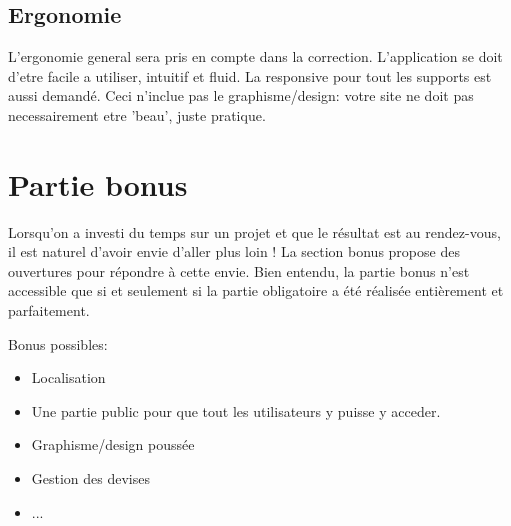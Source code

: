 \documentclass{42}
\begin{document}
    \section{Ergonomie}

        L'ergonomie general sera pris en compte dans la correction.
        L'application se doit d'etre facile a utiliser, intuitif et fluid. La
        responsive pour tout les supports est aussi demand\'e. Ceci n'inclue pas
        le graphisme/design: votre site ne doit pas necessairement etre 'beau',
        juste pratique.


\chapter{Partie bonus}

    Lorsqu'on a investi du temps sur un projet et que le r\'esultat
    est au rendez-vous, il est naturel d'avoir envie d'aller plus loin
    ! La section bonus propose des ouvertures pour r\'epondre \`a
    cette envie. Bien entendu, la partie bonus n'est accessible que si
    et seulement si la partie obligatoire a \'et\'e r\'ealis\'ee
    enti\`erement et parfaitement.\newline

    Bonus possibles:\newline

    \begin{itemize}\itemsep1pt
        \item Localisation
        \item Une partie public pour que tout les utilisateurs y puisse y
        acceder.
        \item Graphisme/design pouss\'ee
        \item Gestion des devises
        \item ...
    \end{itemize}



\end{document}

